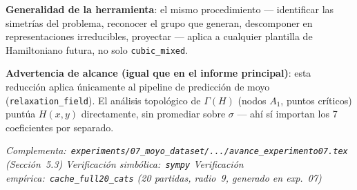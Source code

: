 \documentclass[11pt, a4paper]{article}
\begin{document}
\textbf{Generalidad de la herramienta}: el mismo procedimiento ---
identificar las simetr\'ias del problema, reconocer el grupo que
generan, descomponer en representaciones irreducibles, proyectar ---
aplica a cualquier plantilla de Hamiltoniano futura, no solo
\texttt{cubic\_mixed}.

\begin{tcolorbox}[quotebox]
  \textbf{Advertencia de alcance (igual que en el informe principal)}:
  esta reducci\'on aplica \'unicamente al pipeline de predicci\'on de
  moyo (\texttt{relaxation\_field}). El an\'alisis topol\'ogico de
  $\Gamma(H)$ (nodos $A_1$, puntos cr\'iticos) punt\'ua $H(x,y)$
  directamente, sin promediar sobre $\sigma$ --- ah\'i s\'i importan
  los 7 coeficientes por separado.
\end{tcolorbox}

\vfill
{}\vspace{4pt}
{\color{cMuted}\small\itshape
  Complementa:~\texttt{experiments/07\_moyo\_dataset/.../avance\_experimento07.tex} (Secci\'on~5.3)
  \quad\textbullet\quad
  Verificaci\'on simb\'olica:~\texttt{sympy}
  \quad\textbullet\quad
  Verificaci\'on emp\'irica:~\texttt{cache\_full20\_cats} (20 partidas, radio~9, generado en exp.~07)
}
\end{document}
